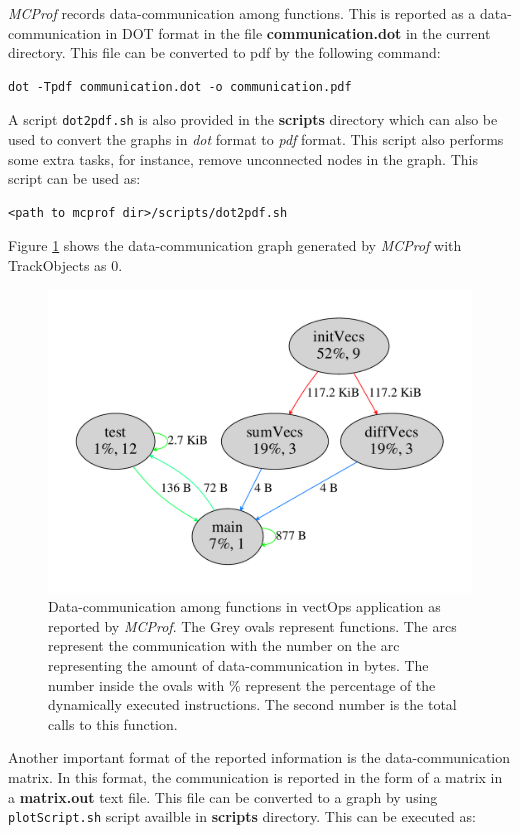 \documentclass[10pt]{article}
\newcommand{\MCPROF}{\emph{MCProf}}
\begin{document}
\MCPROF{} records data-communication among functions. This is reported as a
data-communication in DOT format in the file \textbf{communication.dot} in the
current directory. This file can be converted to pdf by the following command:

{
\small
\begin{Verbatim}[frame=single]
dot -Tpdf communication.dot -o communication.pdf
\end{Verbatim}
}

A script \verb|dot2pdf.sh| is also provided in the \textbf{scripts} directory which can
also be used to convert the graphs in \emph{dot} format to \emph{pdf} format. This script
also performs some extra tasks, for instance, remove unconnected nodes in the
graph. This script can be used as:

{
\small
\begin{Verbatim}[frame=single]
<path to mcprof dir>/scripts/dot2pdf.sh
\end{Verbatim}
}

Figure \ref{fig:comm} shows the data-communication graph generated by \MCPROF{}
with TrackObjects as 0.

\begin{figure}[!h]
\centering
\includegraphics[width=0.55\linewidth]{figures/comm.pdf}
\caption{Data-communication among functions in vectOps application as reported
    by \MCPROF{}. The Grey ovals represent functions. The arcs represent the
    communication with the number on the arc representing the amount of
    data-communication in bytes. The number inside the ovals with \% represent
    the percentage of the dynamically executed instructions. The second number
    is the total calls to this function.}
\label{fig:comm}
\end{figure}

Another important format of the reported information is the data-communication 
matrix. In this format, the communication is reported in the form of a matrix in 
a \textbf{matrix.out} text file. This file can be converted to a graph by using 
\verb|plotScript.sh| script availble in \textbf{scripts} directory. This can be 
executed as:
\end{document}
